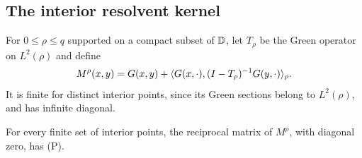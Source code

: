 \subsection{The interior resolvent kernel}

For $0\le\rho\le q$ supported on a compact subset of $\mathbb D$, let $T_\rho$ be the Green operator on $L^2(\rho)$ and define
\begin{equation}\label{eq:M-rho}
M^\rho(x,y)=G(x,y)
+\langle G(x,\cdot),(I-T_\rho)^{-1}G(y,\cdot)\rangle_\rho.
\end{equation}
It is finite for distinct interior points, since its Green sections belong to $L^2(\rho)$, and has infinite diagonal.

\begin{proposition}\label{prop:interior-reciprocal}
For every finite set of interior points, the reciprocal matrix of $M^\rho$, with diagonal zero, has \textup{(P)}.
\end{proposition}
